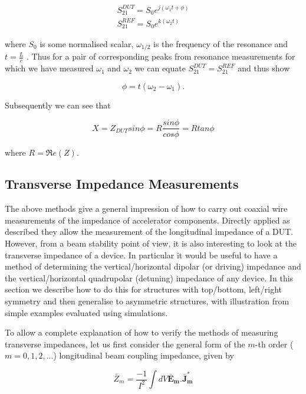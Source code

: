 \begin{align}
S_{21}^{DUT} = S_{0}e^{j \left( \omega_{1}t + \phi \right)} \\
S_{21}^{REF} = S_{0}e^{k \left( \omega_{2}t \right)}
\end{align}

where $S_{0}$ is some normalised scalar, $\omega_{1/2}$ is the frequency of the resonance and $t = \frac{L}{c}$ . Thus for a pair of corresponding peaks from resonance measurements for which we have measured $\omega_{1}$ and $\omega_{2}$ we can equate $S_{21}^{DUT} = S_{21}^{REF}$ and thus show

\begin{equation}
\phi = t \left( \omega_{2} - \omega_{1} \right).
\end{equation}

Subsequently we can see that

\begin{equation}
X = Z_{DUT} sin \phi = R \frac {sin \phi}{cos \phi} = R tan \phi
\end{equation}

where $R = \Re e(Z)$.

\subsection{Transverse Impedance Measurements}

The above methods give a general impression of how to carry out coaxial wire measurements of the impedance of accelerator components. Directly applied as described they allow the measurement of the longitudinal impedance of a DUT. However, from a beam stability point of view, it is also interesting to look at the transverse impedance of a device. In particular it would be useful to have a method of determining the vertical/horizontal dipolar (or driving) impedance and the vertical/horizontal quadrupolar (detuning) impedance of any device. In this section we describe how to do this for structures with top/bottom, left/right symmetry and then generalise to asymmetric structures, with illustration from simple examples evaluated using simulations.

To allow a complete explanation of how to verify the methods of measuring transverse impedances, let us first consider the general form of the $m$-th order ($m = 0, 1, 2,...$) longitudinal beam coupling impedance, given by \cite{Chao:PhysColEff, Tsutsui:OnSingleWire}

\begin{equation}
\bar{Z}_{m} = \frac{-1}{I^{2}} \int dV \mathbf{\bar{E}_{m}. \bar{J}_{m}^{*}}
\end{equation}

